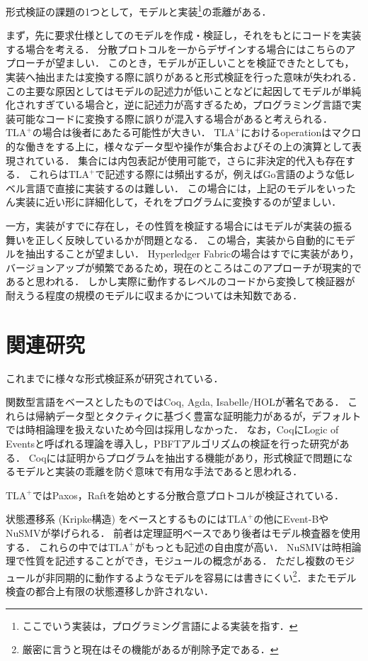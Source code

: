 \documentclass{fose2019}           %
\newcommand{\TLA}{$\text{TLA}^{+}$}
\begin{document}
形式検証の課題の1つとして，モデルと実装\footnote{ここでいう実装は，プログラミング言語による実装を指す．}の乖離がある．

まず，先に要求仕様としてのモデルを作成・検証し，それをもとにコードを実装する場合を考える．
分散プロトコルを一からデザインする場合にはこちらのアプローチが望ましい．
このとき，モデルが正しいことを検証できたとしても，実装へ抽出または変換する際に誤りがあると形式検証を行った意味が失われる．
この主要な原因としてはモデルの記述力が低いことなどに起因してモデルが単純化されすぎている場合と，逆に記述力が高すぎるため，プログラミング言語で実装可能なコードに変換する際に誤りが混入する場合があると考えられる．
\TLA の場合は後者にあたる可能性が大きい．
\TLA におけるoperationはマクロ的な働きをする上に，様々なデータ型や操作が集合およびその上の演算として表現されている．
集合には内包表記が使用可能で，さらに非決定的代入も存在する．
これらは\TLA で記述する際には頻出するが，例えばGo言語のような低レベル言語で直接に実装するのは難しい．
この場合には，上記のモデルをいったん実装に近い形に詳細化して，それをプログラムに変換するのが望ましい．

一方，実装がすでに存在し，その性質を検証する場合にはモデルが実装の振る舞いを正しく反映しているかが問題となる．
この場合，実装から自動的にモデルを抽出することが望ましい．
Hyperledger Fabricの場合はすでに実装があり，バージョンアップが頻繁であるため，現在のところはこのアプローチが現実的であると思われる．
しかし実際に動作するレベルのコードから変換して検証器が耐えうる程度の規模のモデルに収まるかについては未知数である．

\section{関連研究}
\label{sec:related}

これまでに様々な形式検証系が研究されている．

関数型言語をベースとしたものではCoq, Agda, Isabelle/HOLが著名である．
これらは帰納データ型とタクティクに基づく豊富な証明能力があるが，デフォルトでは時相論理を扱えないため今回は採用しなかった．
なお，CoqにLogic of Eventsと呼ばれる理論を導入し，PBFTアルゴリズムの検証を行った研究がある\cite{Velisarios}．
Coqには証明からプログラムを抽出する機能があり，形式検証で問題になるモデルと実装の乖離を防ぐ意味で有用な手法であると思われる．

\TLA ではPaxos，Raftを始めとする分散合意プロトコルが検証されている．

状態遷移系 (Kripke構造) をベースとするものには\TLA の他にEvent-BやNuSMVが挙げられる．
前者は定理証明ベースであり後者はモデル検査器を使用する．
これらの中では\TLA がもっとも記述の自由度が高い．
NuSMVは時相論理で性質を記述することができ，モジュールの概念がある．
ただし複数のモジュールが非同期的に動作するようなモデルを容易には書きにくい\footnote{厳密に言うと現在はその機能があるが削除予定である．}．またモデル検査の都合上有限の状態遷移しか許されない．
\end{document}
